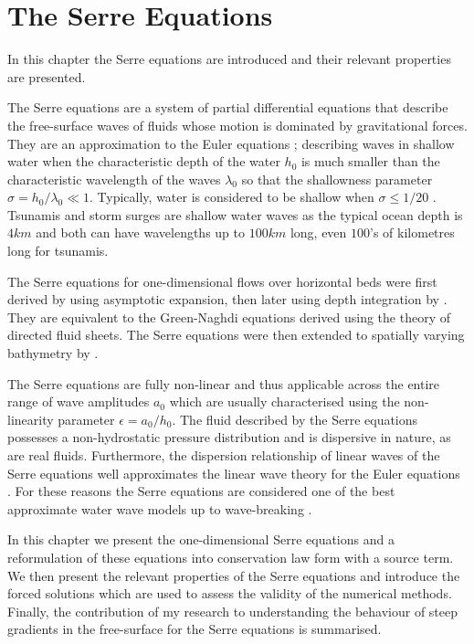 
\chapter{The Serre Equations}
\label{chp:Serreeqns}
In this chapter the Serre equations are introduced and their relevant properties are presented.

The Serre equations are a system of partial differential equations that describe the free-surface waves of fluids whose motion is dominated by gravitational forces. They are an approximation to the Euler equations \cite{Euler-1755-274}; describing waves in shallow water when the characteristic depth of the water $h_0$ is much smaller than the characteristic wavelength of the waves $\lambda_0$ so that the shallowness parameter $ \sigma = h_0 / \lambda_0  \ll 1 $. Typically, water is considered to be shallow when $\sigma  \le  1/ 20$ \cite{Sorenson-2006}. Tsunamis and storm surges are shallow water waves as the typical ocean depth is $4km$ and both can have wavelengths up to $100km$ long, even $100$'s of kilometres long for tsunamis.

The Serre equations for one-dimensional flows over horizontal beds were first derived by \citet{Serre-F-1953-857} using asymptotic expansion, then later using depth integration by \citet{Su-Gardener-1969-536}. They are equivalent to the Green-Naghdi equations \cite{Green-Naghdi-1976-237} derived using the theory of directed fluid sheets. The Serre equations were then extended to spatially varying bathymetry by \citet{Seabra-Santos-etal-1987-117}. 

The Serre equations are fully non-linear and thus applicable across the entire range of wave amplitudes $a_0$ which are usually characterised using the non-linearity parameter $\epsilon = a_0 / h_0$. The fluid described by the Serre equations possesses a non-hydrostatic pressure distribution and is dispersive in nature, as are real fluids. Furthermore, the dispersion relationship of linear waves of the Serre equations well approximates the linear wave theory for the Euler equations \cite{Barthelemy-2004-315}. For these reasons the Serre equations are considered one of the best approximate water wave models up to wave-breaking \cite{Bonneton-Lannes-2009-16601,Bonneton-etal-2011-1479}. 

In this chapter we present the one-dimensional Serre equations and a reformulation of these equations into conservation law form with a source term. We then present the relevant properties of the Serre equations and introduce the forced solutions which are used to assess the validity of the numerical methods. Finally, the contribution of my research to understanding the behaviour of steep gradients in the free-surface for the Serre equations is summarised. 

